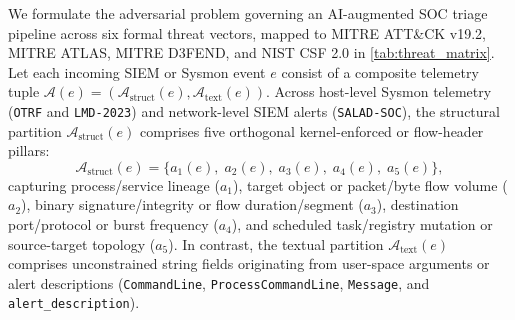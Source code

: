 \documentclass[11pt,a4paper]{article}
\let\oldtexttt\texttt
\renewcommand{\texttt}[1]{\textnormal{\oldtexttt{#1}}}
\begin{document}
We formulate the adversarial problem governing an AI-augmented SOC triage pipeline across six formal threat vectors, mapped to MITRE ATT\&CK v19.2, MITRE ATLAS, MITRE D3FEND, and NIST CSF 2.0 in \cref{tab:threat_matrix}. Let each incoming SIEM or Sysmon event $e$ consist of a composite telemetry tuple $\mathcal{A}(e) = (\mathcal{A}_{\text{struct}}(e), \mathcal{A}_{\text{text}}(e))$. Across host-level Sysmon telemetry (\texttt{OTRF} and \texttt{LMD-2023}) and network-level SIEM alerts (\texttt{SALAD-SOC}), the structural partition $\mathcal{A}_{\text{struct}}(e)$ comprises five orthogonal kernel-enforced or flow-header pillars:
\begin{equation}
\label{eq:astruct}
\mathcal{A}_{\text{struct}}(e) = \bigl\{a_1(e),\; a_2(e),\; a_3(e),\; a_4(e),\; a_5(e)\bigr\},
\end{equation}
capturing process/service lineage ($a_1$), target object or packet/byte flow volume ($a_2$), binary signature/integrity or flow duration/segment ($a_3$), destination port/protocol or burst frequency ($a_4$), and scheduled task/registry mutation or source-target topology ($a_5$). In contrast, the textual partition $\mathcal{A}_{\text{text}}(e)$ comprises unconstrained string fields originating from user-space arguments or alert descriptions (\texttt{CommandLine}, \texttt{ProcessCommandLine}, \texttt{Message}, and \texttt{alert\_description}).
\end{document}
